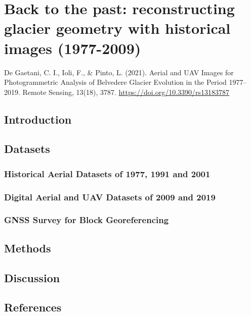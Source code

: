 \chapter{Back to the past: reconstructing glacier geometry with historical images
  (1977-2009)}

\vfill


\noindent De Gaetani, C. I., Ioli, F., \& Pinto, L. (2021). Aerial and UAV Images for
Photogrammetric Analysis of Belvedere Glacier Evolution in the Period 1977–2019. Remote
Sensing, 13(18), 3787. \url{https://doi.org/10.3390/rs13183787}

\newpage

\section{Introduction}\label{sec:4:introduction}

\section{Datasets}\label{sec:4:datasets}

\subsection{Historical Aerial Datasets of 1977, 1991 and 2001}

\subsection{Digital Aerial and UAV Datasets of 2009 and 2019}

\subsection{GNSS Survey for Block Georeferencing}

\section{Methods}\label{sec:4:methods}

\section{Discussion}\label{sec:4:discussion}

\section{References}